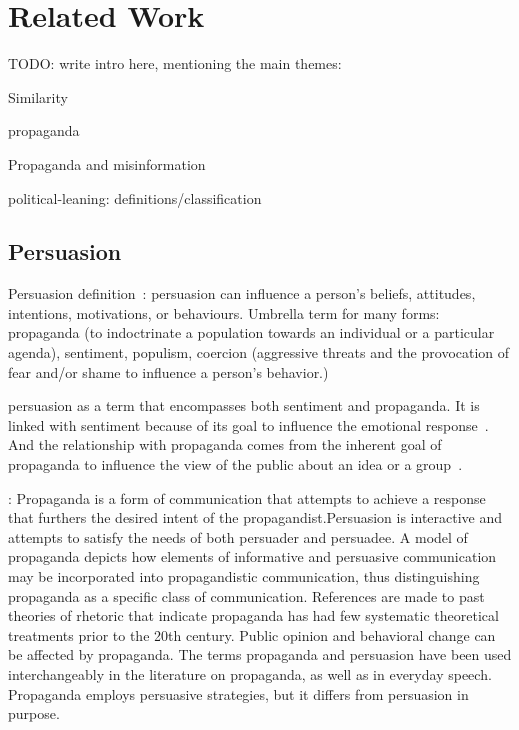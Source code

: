 \chapter{\statusred Related Work}
\label{chap:literature}
TODO: write intro here, mentioning the main themes:

Similarity

\gls{propaganda}

Propaganda and misinformation

\Gls{political-leaning}: definitions/classification


\section{Persuasion}
\label{sec:lit_persuasion}

Persuasion definition~\cite{gass2018persuasion}: \gls{persuasion} can influence a person's beliefs, attitudes, intentions, motivations, or behaviours.
Umbrella term for many forms: \gls{propaganda} (to indoctrinate a population towards an individual or a particular agenda), sentiment, \gls{populism}, coercion (aggressive threats and the provocation of fear and/or shame to influence a person's behavior.)

\gls{persuasion} as a term that encompasses both \gls{sentiment} and \gls{propaganda}. %
It is linked with sentiment because of its goal to influence the emotional response~\citep{gatti2014sentiment,rocklage2018persuasion,petty2015emotion,desteno2004discrete}.
And the relationship with propaganda comes from the inherent goal of propaganda to influence the view of the public about an idea or a group~\citep{bernays,jowett2018propaganda}.

\cite{jowett2012propaganda}:
Propaganda  is  a  form  of  communication  that  attempts  to  achieve a  response  that  furthers  the  desired  intent  of  the  propagandist.Persuasion is interactive and attempts to satisfy the needs of both persuader  and  persuadee.  A  model  of  propaganda  depicts  how  elements of  informative  and  persuasive  communication  may  be  incorporated into  propagandistic  communication,  thus  distinguishing  propaganda as  a  specific  class  of  communication.  References  are  made  to  past theories  of  rhetoric  that  indicate  propaganda  has  had  few  systematic theoretical  treatments  prior  to  the  20th  century.  Public  opinion  and behavioral change can be affected by propaganda.
The terms propaganda and persuasion have been used interchangeably in the literature on propaganda, as well as in everyday speech. Propaganda employs persuasive strategies, but it differs from persuasion in purpose.

